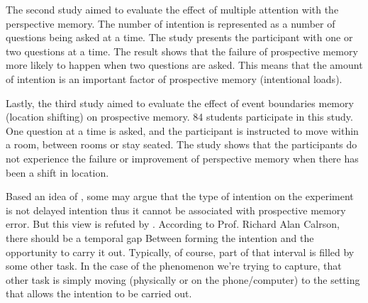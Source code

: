 The second study aimed to evaluate the
effect of multiple attention  with the perspective memory. The number of intention is represented
as a number of questions being asked at a time. The study presents the participant with one or
two questions at a time. The result shows that the failure of prospective memory more likely to
happen when two questions are asked. This means that the amount of intention is an important factor of prospective memory (intentional loads).

Lastly, the third study aimed to evaluate the effect of event boundaries memory (location
shifting) on prospective memory. 84 students participate in this study. One question at a time
is asked, and the participant is instructed to move within a room, between rooms or stay seated.
The study shows that the participants do not experience the failure or improvement of perspective
memory when there has been a shift in location.

Based an idea of \cite{inside1996prospective}, some may argue that the type of intention on the experiment is not delayed intention
thus it cannot be associated with prospective memory error. But this view is
refuted by \cite{10.1371/journal.pone.0074447}. According to Prof. Richard Alan Calrson, there should be a temporal gap
Between forming the intention and the opportunity to carry it out. Typically, of course, part of that interval is filled by some other task.
In the case of the phenomenon we’re trying to capture, that other task is simply moving (physically or on the phone/computer) to the setting that allows the intention to be carried out.
